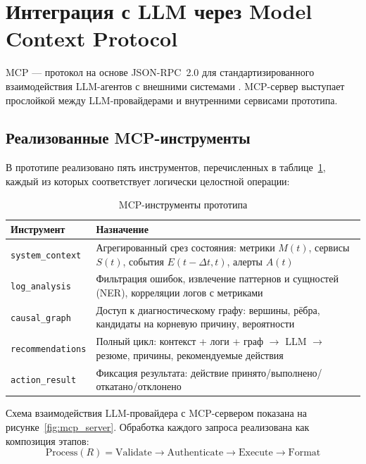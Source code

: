 \section{Интеграция с LLM через Model Context Protocol}
\label{sec:mcp}

MCP --- протокол на основе JSON-RPC~2.0 для стандартизированного взаимодействия LLM-агентов с внешними системами \cite{mcp_specification}. MCP-сервер выступает прослойкой между LLM-провайдерами и внутренними сервисами прототипа.

\subsection{Реализованные MCP-инструменты}

В прототипе реализовано пять инструментов, перечисленных в таблице~\ref{tab:mcp_tools}, каждый из которых соответствует логически целостной операции:

\begin{table}[H]
\centering
\caption{MCP-инструменты прототипа}
\label{tab:mcp_tools}
\begin{tabular}{|p{4cm}|p{7.5cm}|}
\hline
\textbf{Инструмент} & \textbf{Назначение} \\
\hline
\texttt{system\_context} & Агрегированный срез состояния: метрики $M(t)$, сервисы $S(t)$, события $E(t-\Delta t, t)$, алерты $A(t)$ \\
\hline
\texttt{log\_analysis} & Фильтрация ошибок, извлечение паттернов и сущностей (NER), корреляции логов с метриками \\
\hline
\texttt{causal\_graph} & Доступ к диагностическому графу: вершины, рёбра, кандидаты на корневую причину, вероятности \\
\hline
\texttt{recommendations} & Полный цикл: контекст + логи + граф $\to$ LLM $\to$ \linebreak резюме, причины, рекомендуемые действия \\
\hline
\texttt{action\_result} & Фиксация результата: действие принято/выполнено/откатано/отклонено \\
\hline
\end{tabular}
\end{table}

Схема взаимодействия LLM-провайдера с MCP-сервером показана на рисунке~\ref{fig:mcp_server}. Обработка каждого запроса реализована как композиция этапов:
\begin{equation}
\text{Process}(R) = \text{Validate} \to \text{Authenticate} \to \text{Execute} \to \text{Format}
\label{eq:mcp_processing}
\end{equation}


